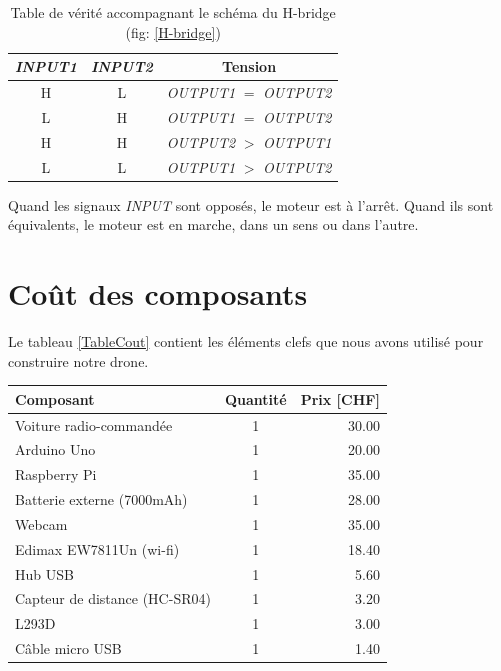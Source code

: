 \documentclass[a4paper,11pt]{report}
\begin{document}
{\begin{table}%
\begin{center}
  \begin{tabular}{c|c||c}  
    \emph{INPUT1} & \emph{INPUT2}
    & Tension\\
    \hline
    H & L & \emph{OUTPUT1} $=$ \emph{OUTPUT2}\\
    L & H & \emph{OUTPUT1} $=$ \emph{OUTPUT2}\\
    H & H & \emph{OUTPUT2} $>$ \emph{OUTPUT1}\\
    L & L & \emph{OUTPUT1} $>$ \emph{OUTPUT2}\\
  \end{tabular}
\end{center}

\caption[Table de v\'erit\'e, H-Bridge]{\label{tableDeVerite} Table de v\'erit\'e accompagnant le sch\'ema du
H-bridge (fig: \ref{H-bridge})}

\small Quand les signaux \emph{INPUT} sont oppos\'es, le moteur est \`a
l'arr\^et. Quand ils sont \'equivalents, le moteur est en marche, dans un sens
ou dans l'autre.\normalsize
\end{table}


\section{Coût des composants}
Le tableau \ref{TableCout} contient les éléments clefs que nous avons utilisé pour construire notre drone.

\begin{centering}
\begin{table}
\begin{tabular}{| l | c | r |}
\hline
Composant & Quantité & Prix [CHF] \\
\hline
Voiture radio-commandée & 1 & 30.00\\
\hline
Arduino Uno & 1 & 20.00 \\
\hline
Raspberry Pi& 1 & 35.00 \\
\hline
Batterie externe (7000mAh) &1 & 28.00 \\
\hline
Webcam & 1 & 35.00\\
\hline
Edimax EW7811Un (wi-fi) & 1 & 18.40\\
\hline
Hub USB & 1 & 5.60\\
\hline
Capteur de distance (HC-SR04) & 1 & 3.20\\
\hline
L293D & 1 & 3.00\\
\hline
Câble micro USB & 1 & 1.40\\
\hline



\end{tabular}
\end{table}
\end{centering}}
\end{document}
